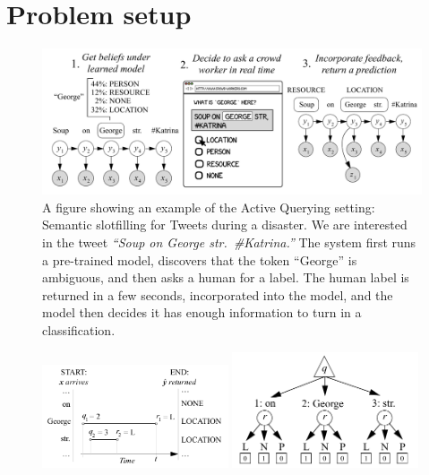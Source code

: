 \section{Problem setup}
\label{sec:model}

\begin{figure}[t]
  \begin{centering}
  \includegraphics[width=1.0\textwidth]{figures/intro-banner.pdf}
  \end{centering}
  \caption{A figure showing an example of the Active Querying setting: Semantic slotfilling for Tweets during a disaster. We are interested in the tweet \textit{``Soup on George str.\ \#Katrina.''} The system first runs a pre-trained model, discovers that the token ``George'' is ambiguous, and then asks a human for a label. The human label is returned in a few seconds, incorporated into the model, and the model then decides it has enough information to turn in a classification.}
\label{fig:crf}
\end{figure}

\begin{figure}[t]
  \begin{centering}
  \includegraphics[width=0.49\textwidth]{figures/piano-roll.pdf}
  \hfill
 \includegraphics[width=0.49\textwidth,height=0.23\textheight,keepaspectratio]{figures/single-move.pdf}
  \end{centering}
  \caption{}
\label{fig:piano-roll}
\end{figure}

